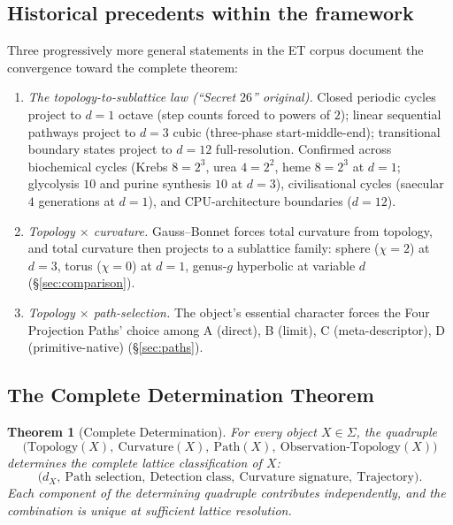 \documentclass[11pt,a4paper]{article}
\newtheorem{theorem}{Theorem}[section]
\theoremstyle{definition}
\theoremstyle{remark}
\begin{document}
\subsection{Historical precedents within the framework}

Three progressively more general statements in the ET corpus document the convergence toward the complete theorem:
\begin{enumerate}[leftmargin=*]
\item \emph{The topology-to-sublattice law (``Secret $26$'' original).} Closed periodic cycles project to $d=1$ octave (step counts forced to powers of $2$); linear sequential pathways project to $d=3$ cubic (three-phase start-middle-end); transitional boundary states project to $d=12$ full-resolution. Confirmed across biochemical cycles (Krebs $8=2^{3}$, urea $4=2^{2}$, heme $8=2^{3}$ at $d=1$; glycolysis $10$ and purine synthesis $10$ at $d=3$), civilisational cycles (saecular $4$ generations at $d=1$), and CPU-architecture boundaries ($d=12$).
\item \emph{Topology $\times$ curvature.} Gauss--Bonnet forces total curvature from topology, and total curvature then projects to a sublattice family: sphere ($\chi = 2$) at $d=3$, torus ($\chi = 0$) at $d=1$, genus-$g$ hyperbolic at variable $d$ (\S\ref{sec:comparison}).
\item \emph{Topology $\times$ path-selection.} The object's essential character forces the Four Projection Paths' choice among A (direct), B (limit), C (meta-descriptor), D (primitive-native) (\S\ref{sec:paths}).
\end{enumerate}

\subsection{The Complete Determination Theorem}

\begin{theorem}[Complete Determination]\label{thm:secret26}
For every object $X\in\Sigma$, the quadruple
\[
\bigl(\text{Topology}(X),\ \text{Curvature}(X),\ \text{Path}(X),\ \text{Observation-Topology}(X)\bigr)
\]
determines the complete lattice classification of $X$:
\[
\bigl(d_{X},\ \text{Path selection},\ \text{Detection class},\ \text{Curvature signature},\ \text{Trajectory}\bigr).
\]
Each component of the determining quadruple contributes independently, and the combination is unique at sufficient lattice resolution.
\end{theorem}
\end{document}
